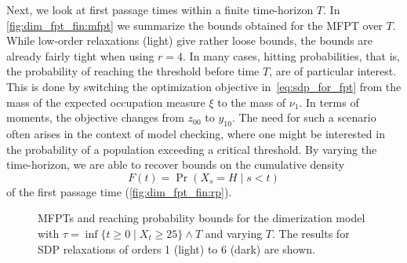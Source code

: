 Next, we look at first passage times within a finite time-horizon $T$.
In \autoref{fig:dim_fpt_fin:mfpt} we summarize the bounds obtained for the \ac{MFPT} over $T$.
While low-order relaxations (light) give rather loose bounds, the bounds are already fairly tight
when using $r=4$.
In many cases, hitting probabilities, that is, the probability of reaching the
threshold before time $T$, are of particular interest.
This is done by switching the optimization objective in~\eqref{eq:sdp_for_fpt} from the mass of the
expected occupation measure $\xi$ to the mass of $\nu_1$.
In terms of moments, the objective changes from $z_{00}$ to $y_{10}$.
The need for such a scenario often aris\-es in the context of model checking, where one might be
interested in the probability of a population exceeding a critical threshold.
By varying the time-horizon, we are able to recover bounds on the cumulative density 
\[
	F(t) = \Pr(X_s=H\mid s<t)
\]
of the first passage time (\autoref{fig:dim_fpt_fin:rp}).
\begin{figure}
    \centering
	\caption[\acp{MFPT} up to a varying time-horizon]{\Acp{MFPT} and reaching probability bounds for the dimerization model with
    $\tau=\inf\{t\geq 0\mid X_t \geq 25\}\land T$ and varying $T$.
	The results for \ac{SDP} relaxations of orders \num{1} (light) to \num{6} (dark) are shown.\label{fig:dim_fpt_fin}}
\end{figure}
